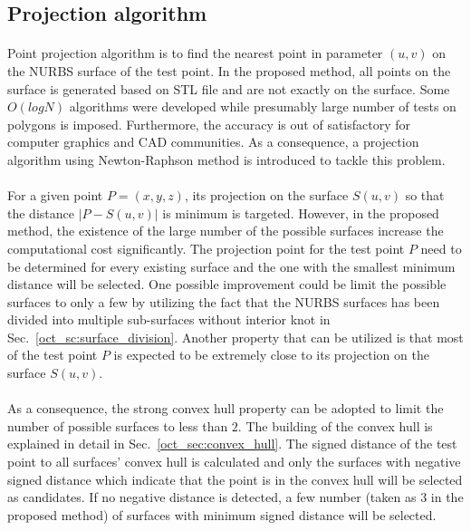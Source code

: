 \subsection{Projection algorithm}
\paragraph{}
Point projection algorithm is to find the nearest point in parameter $(u, v)$ on the NURBS surface of the test point.
In the proposed method, all points on the surface is generated based on STL file and are not exactly on the surface.
Some $O(logN)$ algorithms were developed \citep{Edelsbrunner:1985:CED:4007.4011, Chin1983OptimalAF} while presumably large number of tests on polygons is imposed.
Furthermore, the accuracy is out of satisfactory for computer graphics and CAD communities.
As a consequence, a projection algorithm \citep{MA200379} using Newton-Raphson method is introduced to tackle this problem.

\paragraph{}
For a given point $P=(x,y,z)$, its projection on the surface $S(u, v)$ so that the distance $|P-S(u,v)|$ is minimum is targeted.
However, in the proposed method, the existence of the large number of the possible surfaces increase the computational cost significantly.
The projection point for the test point $P$ need to be determined for every existing surface and the one with the smallest minimum distance will be selected.
One possible improvement could be limit the possible surfaces to only a few by utilizing the fact that the NURBS surfaces has been divided into multiple sub-surfaces without interior knot in Sec.~\ref{oct_sc:surface_division}.
Another property that can be utilized is that most of the test point $P$ is expected to be extremely close to its projection on the surface $S(u,v)$.

\paragraph{}
As a consequence, the strong convex hull property can be adopted to limit the number of possible surfaces to less than $2$.
The building of the convex hull is explained in detail in Sec.~\ref{oct_sec:convex_hull}.
The signed distance of the test point to all surfaces' convex hull is calculated and only the surfaces with negative signed distance which indicate that the point is in the convex hull will be selected as candidates.
If no negative distance is detected, a few number (taken as $3$ in the proposed method) of surfaces with minimum signed distance will be selected.

